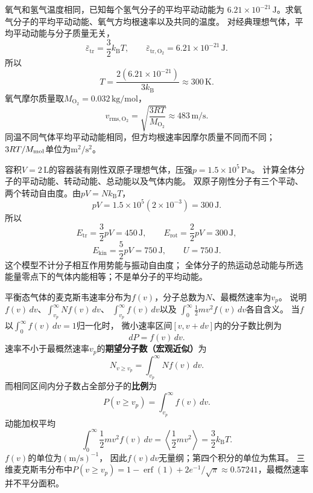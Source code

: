 

\problemtext 氧气和氢气温度相同，已知每个氢气分子的平均平动动能为
$6.21\times10^{-21}\,\mathrm J$。求氧气分子的平均平动动能、氧气方均根速率以及共同的温度。
\workings
对经典理想气体，平均平动动能与分子质量无关，
\[
\bar\varepsilon_{\mathrm{tr}}=\frac32 k_{\mathrm B}T,
\qquad
\boxed{\bar\varepsilon_{\mathrm{tr,O_2}}
=6.21\times10^{-21}\,\mathrm J}.
\]
所以
\[
\boxed{T=\frac{2(6.21\times10^{-21})}{3k_{\mathrm B}}
\approx300\,\mathrm K}.
\]
氧气摩尔质量取$M_{\mathrm{O_2}}=0.032\,\mathrm{kg/mol}$，
\[
\boxed{v_{\mathrm{rms,O_2}}
=\sqrt{\frac{3RT}{M_{\mathrm{O_2}}}}
\approx483\,\mathrm{m/s}}.
\]
\crosscheck 同温不同气体平均平动动能相同，但方均根速率因摩尔质量不同而不同；
$3RT/M_{\rm mol}$单位为$\mathrm{m^2/s^2}$。

\problemtext 容积$V=2\,\mathrm L$的容器装有刚性双原子理想气体，压强$p=1.5\times10^5\,\mathrm{Pa}$。
计算全体分子的平动动能、转动动能、总动能以及气体内能。
\workings
双原子刚性分子有三个平动、两个转动自由度。由$pV=Nk_{\mathrm B}T$，
\[
pV=1.5\times10^5(2\times10^{-3})=300\,\mathrm J.
\]
所以
\[
\boxed{E_{\mathrm{tr}}=\frac32pV=450\,\mathrm J},\qquad
\boxed{E_{\mathrm{rot}}=\frac22pV=300\,\mathrm J},
\]
\[
\boxed{E_{\mathrm{kin}}=\frac52pV=750\,\mathrm J},
\qquad
\boxed{U=750\,\mathrm J}.
\]
\crosscheck 这个模型不计分子相互作用势能与振动自由度；
全体分子的热运动总动能与所选能量零点下的气体内能相等；不是单分子的平均动能。

\problemtext 平衡态气体的麦克斯韦速率分布为$f(v)$，分子总数为$N$、最概然速率为$v_p$。
说明$f(v)\,dv$、$\int_{v_p}^\infty Nf(v)\,dv$、
$\int_{v_p}^\infty f(v)\,dv$以及
$\int_0^\infty\tfrac12mv^2f(v)\,dv$各自含义。
\workings
当$f$以$\int_0^\infty f(v)\,dv=1$归一化时，
微小速率区间$[v,v+dv]$内的分子数比例为
\[
\boxed{dP=f(v)\,dv}.
\]
速率不小于最概然速率$v_p$的\textbf{期望分子数（宏观近似）}为
\[
\boxed{N_{v\ge v_p}=\int_{v_p}^\infty Nf(v)\,dv}.
\]
而相同区间内分子数占全部分子的\textbf{比例}为
\[
\boxed{P(v\ge v_p)=\int_{v_p}^\infty f(v)\,dv}.
\]
动能加权平均
\[
\boxed{\int_0^\infty\frac12mv^2 f(v)\,dv
=\left\langle\frac12mv^2\right\rangle
=\frac32k_{\mathrm B}T}.
\]
\crosscheck $f(v)$的单位为$(\mathrm{m/s})^{-1}$，
因此$f(v)dv$无量纲；第四个积分的单位为焦耳。
三维麦克斯韦分布中$P(v\ge v_p)=1-\operatorname{erf}(1)+2e^{-1}/\sqrt\pi\approx0.57241$，最概然速率并不平分面积。

